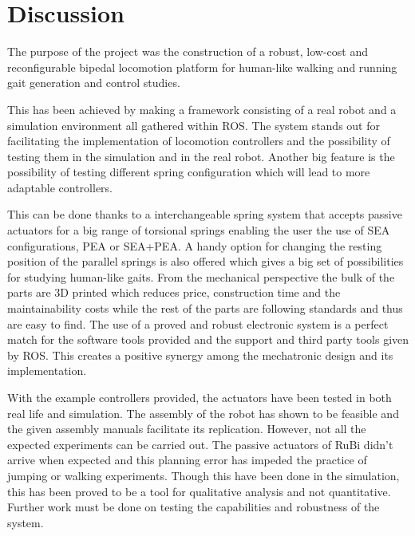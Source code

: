 \chapter{Discussion} %
\label{cha:discussion}
The purpose of the project was the construction of a robust, low-cost
and reconfigurable bipedal locomotion platform for human-like walking and running gait
generation and control studies.

This has been achieved by making a framework consisting of a real robot and a simulation environment all gathered within ROS.
The system stands out for facilitating the implementation of locomotion controllers and the possibility of testing them in the simulation and in the real robot.
Another big feature is the possibility of testing different spring configuration which will lead to more adaptable controllers.

This can be done thanks to a interchangeable spring system that accepts passive actuators for a big range of torsional springs enabling the user the use of SEA configurations, PEA or SEA+PEA.
A handy option for changing the resting position of the parallel springs is also offered which gives a big set of possibilities for studying human-like gaits.
From the mechanical perspective the bulk of the parts are 3D printed which reduces price, construction time and the maintainability costs while the rest of the parts are following standards and thus are easy to find.
The use of a proved and robust electronic system is a perfect match for the software tools provided and the support and third party tools given by ROS.
This creates a positive synergy among the mechatronic design and its implementation.

With the example controllers provided, the actuators have been tested in both real life and simulation.
The assembly of the robot has shown to be feasible and the given assembly manuals facilitate its replication.
However, not all the expected experiments can be carried out.
The passive actuators of RuBi didn't arrive when expected and this planning error has impeded the practice of jumping or walking experiments.
Though this have been done in the simulation, this has been proved to be a tool for qualitative analysis and not quantitative.
Further work must be done on testing the capabilities and robustness of the system.

